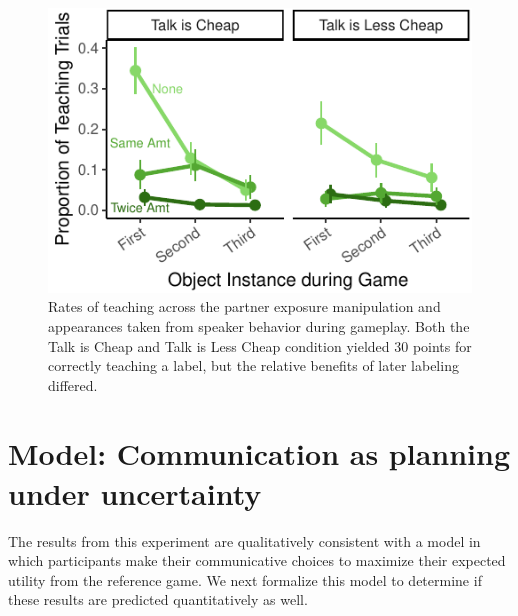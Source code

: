 \documentclass[10pt, letterpaper]{article}
\newenvironment{CodeChunk}{}{}
\begin{document}
\begin{CodeChunk}
\begin{figure}[tb]
\includegraphics{figs/imp_teach-1} \caption[Rates of teaching across the partner exposure manipulation and appearances taken from speaker behavior during gameplay]{Rates of teaching across the partner exposure manipulation and appearances taken from speaker behavior during gameplay. Both the Talk is Cheap and Talk is Less Cheap condition yielded 30 points for correctly teaching a label, but the relative benefits of later labeling differed.}\label{fig:imp_teach}
\end{figure}
\end{CodeChunk}

\section{Model: Communication as planning under
uncertainty}\label{model-communication-as-planning-under-uncertainty}

The results from this experiment are qualitatively consistent with a
model in which participants make their communicative choices to maximize
their expected utility from the reference game. We next formalize this
model to determine if these results are predicted quantitatively as
well.

\newcommand{\E}[1]{\mathbb{E}\left[ #1 \right]}
\end{document}
